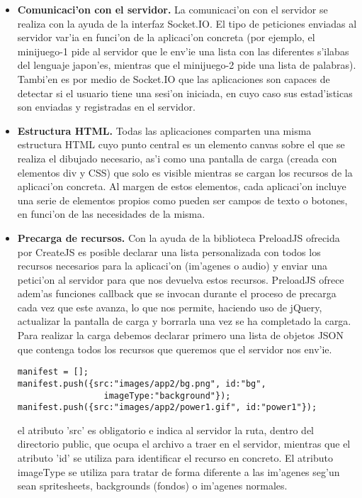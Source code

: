 \begin{itemize}
\item \textbf{Comunicaci'on con el servidor.} La comunicaci'on con el servidor se realiza con la ayuda de la interfaz 
Socket.IO. El tipo de peticiones enviadas al servidor var'ia en funci'on de la aplicaci'on concreta (por ejemplo, el
minijuego-1 pide al servidor que le env'ie una lista con las diferentes s'ilabas del lenguaje japon'es, mientras que
el minijuego-2 pide una lista de palabras).
Tambi'en es por medio de Socket.IO que las aplicaciones son capaces de detectar si el usuario tiene una sesi'on 
iniciada, en cuyo caso sus estad'isticas son enviadas y registradas en el servidor.
\item \textbf{Estructura HTML.} Todas las aplicaciones comparten una misma estructura HTML cuyo punto central es un elemento
canvas sobre el que se realiza el dibujado necesario, as'i como una pantalla de carga (creada con elementos div y 
CSS) que solo es visible mientras se cargan los recursos de la aplicaci'on concreta.
Al margen de estos elementos, cada aplicaci'on incluye una serie de elementos propios como pueden ser campos de texto
o botones, en funci'on de las necesidades de la misma.
\item \textbf{Precarga de recursos.} Con la ayuda de la biblioteca PreloadJS ofrecida por CreateJS es posible declarar una
lista personalizada con todos los recursos necesarios para la aplicaci'on (im'agenes o audio) y enviar una petici'on
al servidor para que nos devuelva estos recursos.
PreloadJS ofrece adem'as funciones callback que se invocan durante el proceso de precarga cada vez que este avanza,
lo que nos permite, haciendo uso de jQuery, actualizar la pantalla de carga y borrarla una vez se ha completado la
carga.
Para realizar la carga debemos declarar primero una lista de objetos JSON que contenga todos los recursos que 
queremos que el servidor nos env'ie.

\begin{verbatim}
manifest = [];
manifest.push({src:"images/app2/bg.png", id:"bg", 
                 imageType:"background"});
manifest.push({src:"images/app2/power1.gif", id:"power1"});
\end{verbatim}

el atributo 'src' es obligatorio e indica al servidor la ruta, dentro del directorio public, que ocupa el archivo
a traer en el servidor, mientras que el atributo 'id' se utiliza para identificar el recurso en concreto. El atributo
imageType se utiliza para tratar de forma diferente a las im'agenes seg'un sean spritesheets, backgrounds (fondos)
o im'agenes normales.


\end{itemize}
